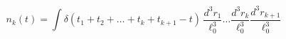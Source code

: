 \begin{equation}\label{eq1}
n_{k}(t) = \int\delta(t_{1}+t_{2}+\ldots +t_{k}+t_{k+1}-t)\,
\frac{d^{3}r_{1}}{\ell_0^3}\ldots \frac{d^{3}r_{k}}{\ell_0^3}
\frac{d^{3}r_{k+1}}{\ell_0^3}
\end{equation}


